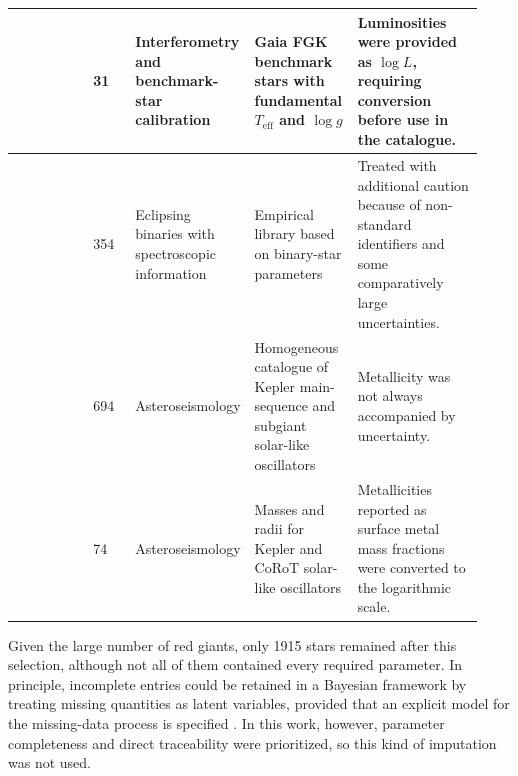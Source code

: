 \begin{table}[H]
\begin{tabular}{p{0.17\linewidth}p{0.09\linewidth}p{0.18\linewidth}p{0.22\linewidth}p{0.27\linewidth}}
\hline
\citet{Soubiran2024} & 31 & Interferometry and benchmark-star calibration & Gaia FGK benchmark stars with fundamental $T_{\mathrm{eff}}$ and $\log g$ & Luminosities were provided as $\log L$, requiring conversion before use in the catalogue. \\
\hline
\citet{Xiong2023} & 354 & Eclipsing binaries with spectroscopic information & Empirical library based on binary-star parameters & Treated with additional caution because of non-standard identifiers and some comparatively large uncertainties. \\
\hline
\citet{Sayeed2025} & 694 & Asteroseismology & Homogeneous catalogue of Kepler main-sequence and subgiant solar-like oscillators & Metallicity was not always accompanied by uncertainty. \\
\hline
\citet{Yildiz2019} & 74 & Asteroseismology & Masses and radii for Kepler and CoRoT solar-like oscillators & Metallicities reported as surface metal mass fractions were converted to the logarithmic scale. \\
\hline
\end{tabular}
\end{table}





Given the large number of red giants, only 1915 stars remained after this selection, although not all of them contained every required parameter. In principle, incomplete entries could be retained in a Bayesian framework by treating missing quantities as latent variables, provided that an explicit model for the missing-data process is specified \citep[p.~511]{mcelreath2020rethinking}. In this work, however, parameter completeness and direct traceability were prioritized, so this kind of imputation was not used. %


